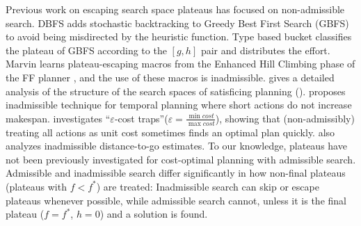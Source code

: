Previous work on escaping search space plateaus has focused on
non-admissible search.  DBFS \cite{imai2011novel} %
adds stochastic backtracking to Greedy Best First Search (GBFS) to avoid
being misdirected by the heuristic function. Type based bucket
\cite{xie14type} classifies the plateau of GBFS according to the
$[g,h]$ pair and distributes the effort.  Marvin \cite{Coles07} learns plateau-escaping macros
from the Enhanced Hill Climbing phase of the FF planner
\cite{Hoffmann01}, and the use of these macros is inadmissible.
\citeauthor{Hoffmann05} gives a detailed analysis of the
structure of the search spaces of satisficing planning (\citeyear{Hoffmann05,Hoffmann11}).
\cite{benton2010g} proposes inadmissible technique for temporal planning
where short actions 
do not increase makespan. 
\cite{cushing2010cost} investigates ``$\varepsilon$-cost
traps''($\varepsilon=\frac{\min cost}{\max cost}$),  showing that (non-admissibly) treating all actions as unit cost sometimes finds an optimal plan quickly.
\cite{wilt2011cost} also analyzes inadmissible distance-to-go estimates.
% 
To our knowledge, 
plateaus have not been previously investigated for cost-optimal planning with admissible search.
Admissible and inadmissible search differ significantly in how non-final plateaus (plateaus with $f < f^*$) are treated:
Inadmissible search can skip or escape plateaus whenever possible, while
admissible search cannot, unless it
is the final plateau ($f=f^*$, $h=0$) and a solution is found. %



